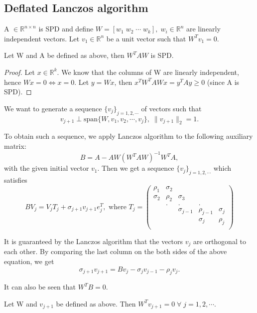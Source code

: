 \documentclass[10pt,a4paper]{article}
\begin{document}
\subsection{Deflated Lanczos algorithm}

A $\in \mathbb{R}^{n \times n}$ is SPD and define $W=[w_1\;w_2\;\cdots\;w_k],\;w_i\in\mathbb{R}^n$ are linearly independent vectors. Let $v_1\in\mathbb{R}^n$ be a unit vector such that $W^Tv_1=0.$

\begin{proposition}
Let W and A be defined as above, then $W^TAW$ is SPD.
\end{proposition}

\begin{proof}
Let $x\in\mathbb{R}^k$. We know that the columns of W are linearly independent, hence $Wx=0 \Leftrightarrow x=0.$ Let $y=Wx$, then $x^TW^TAWx=y^TAy\ge 0$ (since A is SPD).
\end{proof}

We want to generate a sequence $\{v_j\}_{j=1,2,\cdots}$ of vectors such that 
$$v_{j+1}\perp \text{span}\{W,v_1,v_2,\cdots,v_j\},\;\|v_{j+1}\|_2=1.$$

To obtain such a sequence, we apply Lanczos algorithm to the following auxiliary  matrix:
$$B=A-AW(W^TAW)^{-1}W^TA,$$
with the given initial vector $v_1$. Then we get a sequence $\{v_j\}_{j=1,2,\cdots}$ which satisfies
$$BV_j=V_jT_j+\sigma_{j+1}v_{j+1}e^T_j,\text{ where }
T_j = \left( \begin{array}{ccccc}
\rho_1 & \sigma_2 &  &  &  \\
\sigma_2 & \rho_2 & \sigma_3 &  &  \\
 & . & . & . &  \\
 &  & \sigma_{j-1} & \rho_{j-1} & \sigma_{j} \\
 &  &  & \sigma_j & \rho_j \\
\end{array} \right)$$

It is guaranteed by the Lanczos algorithm that the vectors $v_j$ are orthogonal to each other. By comparing the last column on the both sides of the above equation, we get
$$\sigma_{j+1}v_{j+1}=Bv_j-\sigma_jv_{j-1}-\rho_jv_j.$$

It can also be seen that $W^TB=0.$

\begin{proposition}
Let W and $v_{j+1}$ be defined as above. Then $W^Tv_{j+1}=0\;\forall\;j=1,2,\cdots.$
\end{proposition}
\end{document}
